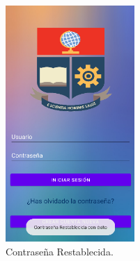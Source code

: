 \documentclass[a4paper,10pt, oneside, titlepage]{article}
\begin{document}
	\begin{figure}[!ht]
		\centering
		\includegraphics[width = .4\linewidth, height = 9cm]{28.png}
		\caption{Contraseña Restablecida.}
	\end{figure}
	
\end{document}
